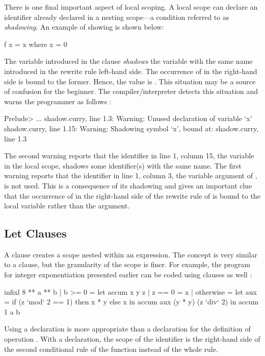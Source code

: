 There is one final important aspect of local scoping.
A local scope can declare an identifier already declared
in a nesting scope---a condition referred to as
\emph{shadowing}.
An example of showing is shown below:
%
\begin{prog}
f x = x where x = 0
\end{prog}
%
The variable  introduced in the  clause
\emph{shadows} the variable with the same name introduced in
the rewrite rule left-hand side.
The occurrence of  in the right-hand side is
bound to the former.
Hence, the value  is .
This situation may be a source of confusion for the beginner.
The \pakcs{} compiler/interpreter detects this situation and
warns the programmer as follows
:
%
\begin{prog}
Prelude> 
...
shadow.curry, line 1.3: Warning:
    Unused declaration of variable `x'
shadow.curry, line 1.15: Warning:
    Shadowing symbol `x', bound at: shadow.curry, line 1.3
\end{prog}
%
The second warning reports that the identifier in line 1,
column 15, the variable  in the local scope,
shadows some identifier(s) with the same name.
The first warning reports that
the identifier in line 1, column 3,
the variable  argument of ,
is not used.  This is a consequence of its shadowing and
gives an important clue that the occurrence of 
in the right-hand side of the rewrite rule of 
is bound to the local variable rather than the argument.


\subsection{{\selectfont Let} Clauses}
\label{let-clause}

A 
clause creates a scope nested within an expression.
The concept is very similar to a  clause,
but the granularity of the scope is finer.
For example, the program for integer exponentiation
presented earlier can be coded using  clauses
as well
:
%
\begin{prog}
infixl 8 **
a ** b | b >= 0 = 
  let accum x y z | z == 0    = x
                  | otherwise =
                       let aux = if (z `mod` 2 == 1) then x * y else x
                       in  accum aux (y * y) (z `div` 2)
  in  accum 1 a b
\end{prog}
%
Using a  declaration is more appropriate than a
 declaration for the definition of operation .
With a  declaration, the scope of the identifier 
is the right-hand side of the second conditional rule of
the function  instead of the whole rule.

